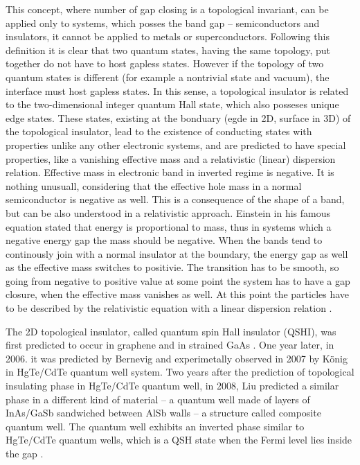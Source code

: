 \documentclass[titlepage,a4paper]{book}
\begin{document}
This concept, where number of gap closing is a topological invariant, can be applied only to systems, which posses the band gap -- semiconductors and insulators, it cannot be applied to metals or superconductors. Following this definition it is clear that two quantum states, having the same topology, put together do not have to host gapless states. However if the topology of two quantum states is different (for example a nontrivial state and vacuum), the interface must host gapless states. In this sense, a topological insulator is related to the two-dimensional integer quantum Hall state, which also posseses  unique edge states. These states, existing at the bonduary (egde in 2D, surface in 3D) of the topological insulator, lead to the existence of conducting states with properties unlike any other electronic systems, and are predicted to have special properties, like a vanishing effective mass and a relativistic (linear) dispersion relation. Effective mass in electronic band in inverted regime is negative. It is nothing unusuall, considering that the effective hole mass in a normal semiconductor is negative as well. This is a consequence of the shape of a band, but can be also understood in a relativistic approach. Einstein in his famous equation stated that energy is proportional to mass, thus in systems which a negative energy gap the mass should be negative. When the bands tend to continously join with a normal insulator at the boundary, the energy gap as well as the effective mass switches to positivie. The transition has to be smooth, so going from negative to positive value at some point the system has to have a gap closure, when the effective mass vanishes as well. At this point the particles have to be described by the relativistic equation with a linear dispersion relation \cite{Zawadzki_Topology}.    
	
The 2D topological insulator, called quantum spin Hall insulator (QSHI), was first predicted to occur in graphene \cite{Kane_Topology} and in strained GaAs \cite{Bernevig_Topology2}. One year later, in 2006. it was predicted by Bernevig \cite{Bernevig_Topology2}\cite{Bernevig_Topology1} and experimetally observed in 2007 by König \cite{Konig_Topology} in HgTe/CdTe quantum well system. Two years after the prediction of topological insulating phase in HgTe/CdTe quantum well, in 2008, Liu predicted a similar phase in a different kind of material -- a quantum well made of layers of InAs/GaSb sandwiched between AlSb walls -- a structure called composite quantum well. The quantum well exhibits an inverted phase similar to HgTe/CdTe quantum wells, which is a QSH state when the Fermi level lies inside the gap \cite{Liu_Topology}. 
\end{document}
